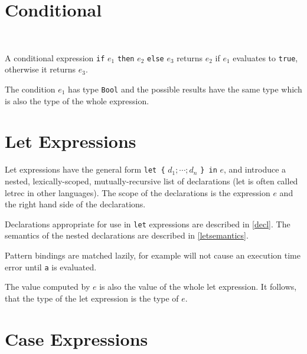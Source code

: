 \section{Conditional} \label{conditional} 

\begin{flushleft}
      \\
\end{flushleft}

A conditional expression \texttt{if} $e_1$ \texttt{then} $e_2$ \texttt{else} $e_3$ returns $e_2$ if $e_1$ evaluates to \texttt{true}, otherwise it returns $e_3$.

The condition $e_1$ has type \texttt{Bool} and the possible results have the same type which is also the type of the whole expression.

\section{Let Expressions}  \label{letexpr}

\begin{flushleft}
  \bracea{}  \bracez{}  
\end{flushleft}

Let expressions have the general form
\texttt{let \{} $d_1 ; \cdots{} ; d_n$  \texttt{\} in} $e$,
and introduce a nested,
lexically-scoped, mutually-recursive list of declarations
(let is often called letrec in other languages).
The scope of the declarations is the expression $e$ and the right hand side of the declarations.

Declarations appropriate for use in \texttt{let} expressions are described in \autoref{decl}. The semantics of the nested declarations are described in \autoref{letsemantics}.

Pattern bindings are matched lazily, for example  will not cause an execution time error until \texttt{a} is evaluated.

The value computed by $e$ is also the value of the whole let expression. It follows, that the type of the let expression is the type of $e$.

\section{Case Expressions} \label{caseex} 

